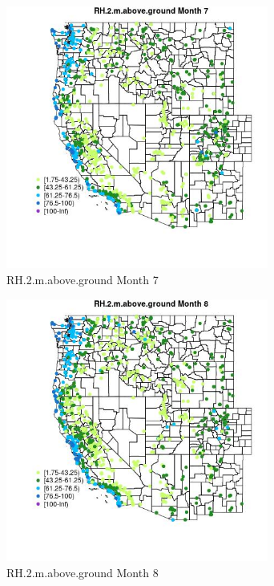 \begin{figure} 
\centering  
\includegraphics[width=0.77\textwidth]{Code_Outputs/Report_ML_input_PM25_Step4_part_f_de_duplicated_aveswNAs_MapObsMo7RH2maboveground.jpg} 
\caption{\label{fig:Report_ML_input_PM25_Step4_part_f_de_duplicated_aveswNAsMapObsMo7RH2maboveground}RH.2.m.above.ground Month 7} 
\end{figure} 
 

\begin{figure} 
\centering  
\includegraphics[width=0.77\textwidth]{Code_Outputs/Report_ML_input_PM25_Step4_part_f_de_duplicated_aveswNAs_MapObsMo8RH2maboveground.jpg} 
\caption{\label{fig:Report_ML_input_PM25_Step4_part_f_de_duplicated_aveswNAsMapObsMo8RH2maboveground}RH.2.m.above.ground Month 8} 
\end{figure} 
 

